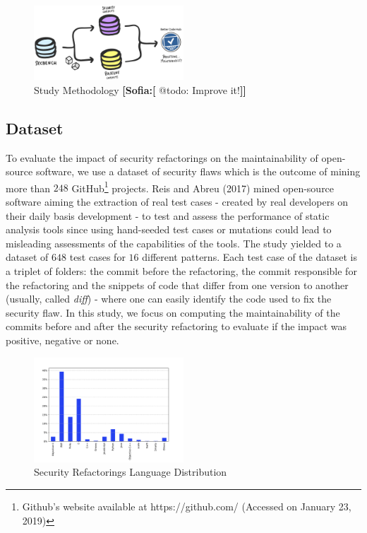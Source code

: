 \documentclass[10pt,conference]{IEEEtran}
\newcommand{\Sof}[1]{\textbf{[Sofia:[}{\color{red} #1}\textbf{]]}}
\begin{document}
\begin{figure}[h]
 	\centering 	\includegraphics[width=0.5\textwidth]{figures/methodology.pdf}
 	\caption{Study Methodology \Sof{@todo: Improve it!}}
	\label{fig:met}
\end{figure}

\subsection{Dataset}

To evaluate the impact of security refactorings on the maintainability of open-source software, we use a dataset of security flaws which is the outcome of mining more than $248$ GitHub\footnote{Github's website available at https://github.com/ (Accessed on January 23, 2019)} projects. Reis and Abreu (2017) mined open-source software aiming the extraction of real test cases - created by real developers on their daily basis development - to test and assess the performance of static analysis tools since using hand-seeded test cases or mutations could lead to misleading assessments of the capabilities of the tools. The study yielded to a dataset of $648$ test cases for $16$ different patterns. Each test case of the dataset is a triplet of folders: the commit before the refactoring, the commit responsible for the refactoring and the snippets of code that differ from one version to another (usually, called \textit{diff}) - where one can easily identify the code used to fix the security flaw. In this study, we focus on computing the maintainability of the commits before and after the security refactoring to evaluate if the impact was positive, negative or none.

\begin{figure}[h]
 	\centering 	\includegraphics[width=0.5\textwidth]{figures/language_dist.pdf}
 	\caption{Security Refactorings Language Distribution}
	\label{fig:lang}
\end{figure}
\end{document}
